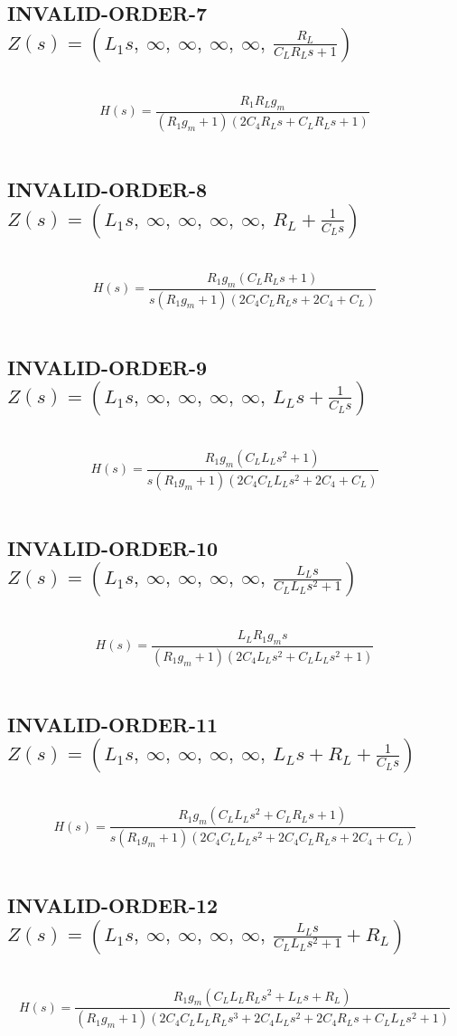 \documentclass{article}
\begin{document}
\subsection{INVALID-ORDER-7 $Z(s) = \left( L_{1} s, \  \infty, \  \infty, \  \infty, \  \infty, \  \frac{R_{L}}{C_{L} R_{L} s + 1}\right)$ } \ 
\textbf{\[H(s) = \frac{R_{1} R_{L} g_{m}}{\left(R_{1} g_{m} + 1\right) \left(2 C_{4} R_{L} s + C_{L} R_{L} s + 1\right)}\] } \ 
\subsection{INVALID-ORDER-8 $Z(s) = \left( L_{1} s, \  \infty, \  \infty, \  \infty, \  \infty, \  R_{L} + \frac{1}{C_{L} s}\right)$ } \ 
\textbf{\[H(s) = \frac{R_{1} g_{m} \left(C_{L} R_{L} s + 1\right)}{s \left(R_{1} g_{m} + 1\right) \left(2 C_{4} C_{L} R_{L} s + 2 C_{4} + C_{L}\right)}\] } \ 
\subsection{INVALID-ORDER-9 $Z(s) = \left( L_{1} s, \  \infty, \  \infty, \  \infty, \  \infty, \  L_{L} s + \frac{1}{C_{L} s}\right)$ } \ 
\textbf{\[H(s) = \frac{R_{1} g_{m} \left(C_{L} L_{L} s^{2} + 1\right)}{s \left(R_{1} g_{m} + 1\right) \left(2 C_{4} C_{L} L_{L} s^{2} + 2 C_{4} + C_{L}\right)}\] } \ 
\subsection{INVALID-ORDER-10 $Z(s) = \left( L_{1} s, \  \infty, \  \infty, \  \infty, \  \infty, \  \frac{L_{L} s}{C_{L} L_{L} s^{2} + 1}\right)$ } \ 
\textbf{\[H(s) = \frac{L_{L} R_{1} g_{m} s}{\left(R_{1} g_{m} + 1\right) \left(2 C_{4} L_{L} s^{2} + C_{L} L_{L} s^{2} + 1\right)}\] } \ 
\subsection{INVALID-ORDER-11 $Z(s) = \left( L_{1} s, \  \infty, \  \infty, \  \infty, \  \infty, \  L_{L} s + R_{L} + \frac{1}{C_{L} s}\right)$ } \ 
\textbf{\[H(s) = \frac{R_{1} g_{m} \left(C_{L} L_{L} s^{2} + C_{L} R_{L} s + 1\right)}{s \left(R_{1} g_{m} + 1\right) \left(2 C_{4} C_{L} L_{L} s^{2} + 2 C_{4} C_{L} R_{L} s + 2 C_{4} + C_{L}\right)}\] } \ 
\subsection{INVALID-ORDER-12 $Z(s) = \left( L_{1} s, \  \infty, \  \infty, \  \infty, \  \infty, \  \frac{L_{L} s}{C_{L} L_{L} s^{2} + 1} + R_{L}\right)$ } \ 
\textbf{\[H(s) = \frac{R_{1} g_{m} \left(C_{L} L_{L} R_{L} s^{2} + L_{L} s + R_{L}\right)}{\left(R_{1} g_{m} + 1\right) \left(2 C_{4} C_{L} L_{L} R_{L} s^{3} + 2 C_{4} L_{L} s^{2} + 2 C_{4} R_{L} s + C_{L} L_{L} s^{2} + 1\right)}\] } \ 
\end{document}
